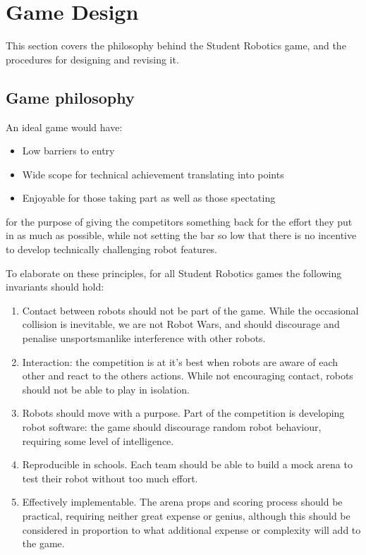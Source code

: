 \section{Game Design}

This section covers the philosophy behind the Student Robotics game, and the
procedures for designing and revising it.

\subsection{Game philosophy}

An ideal game would have:
\begin{itemize}
	\item Low barriers to entry
	\item Wide scope for technical achievement translating into points
	\item Enjoyable for those taking part as well as those spectating
\end{itemize}

for the purpose of giving the competitors something back for the effort they
put in as much as possible, while not setting the bar so low that there is no
incentive to develop technically challenging robot features.

To elaborate on these principles, for all Student Robotics games the following
invariants should hold:
\begin{enumerate}
	\item Contact between robots should not be part of the game. While the occasional collision is inevitable, we are not Robot Wars, and should discourage and penalise unsportsmanlike interference with other robots.
	\item Interaction: the competition is at it's best when robots are aware of each other and react to the others actions. While not encouraging contact, robots should not be able to play in isolation.
	\item Robots should move with a purpose. Part of the competition is developing robot software: the game should discourage random robot behaviour, requiring some level of intelligence.
	\item Reproducible in schools. Each team should be able to build a mock arena to test their robot without too much effort.
	\item Effectively implementable. The arena props and scoring process should be practical, requiring neither great expense or genius, although this should be considered in proportion to what additional expense or complexity will add to the game.
\end{enumerate}

